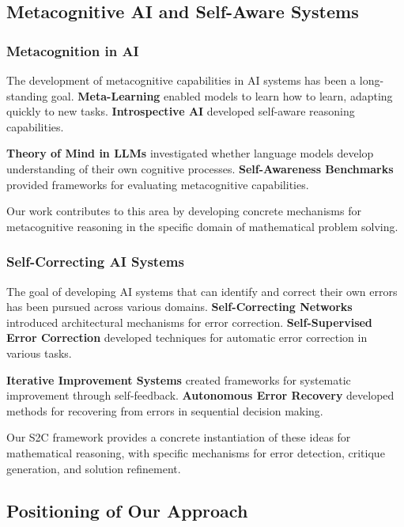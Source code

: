 \documentclass[10pt,twocolumn]{article}
\newcommand{\ssc}{\textsc{S2C}}
\begin{document}
\subsection{Metacognitive AI and Self-Aware Systems}

\subsubsection{Metacognition in AI}

The development of metacognitive capabilities in AI systems has been a long-standing goal. \textbf{Meta-Learning} \cite{finn2017model} enabled models to learn how to learn, adapting quickly to new tasks. \textbf{Introspective AI} \cite{foerster2018counterfactual} developed self-aware reasoning capabilities.

\textbf{Theory of Mind in LLMs} \cite{kosinski2023theory} investigated whether language models develop understanding of their own cognitive processes. \textbf{Self-Awareness Benchmarks} \cite{mitchell2023self} provided frameworks for evaluating metacognitive capabilities.

Our work contributes to this area by developing concrete mechanisms for metacognitive reasoning in the specific domain of mathematical problem solving.

\subsubsection{Self-Correcting AI Systems}

The goal of developing AI systems that can identify and correct their own errors has been pursued across various domains. \textbf{Self-Correcting Networks} \cite{graves2016adaptive} introduced architectural mechanisms for error correction. \textbf{Self-Supervised Error Correction} \cite{he2019self} developed techniques for automatic error correction in various tasks.

\textbf{Iterative Improvement Systems} \cite{liu2023iterative} created frameworks for systematic improvement through self-feedback. \textbf{Autonomous Error Recovery} \cite{chen2023autonomous} developed methods for recovering from errors in sequential decision making.

Our \ssc{} framework provides a concrete instantiation of these ideas for mathematical reasoning, with specific mechanisms for error detection, critique generation, and solution refinement.

\subsection{Positioning of Our Approach}
\end{document}
